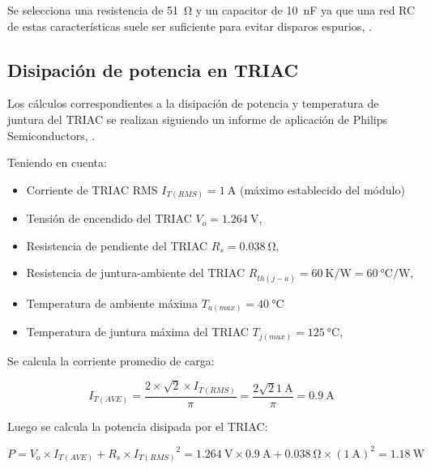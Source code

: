 Se selecciona una resistencia de \SI{51}{\ohm} y un capacitor de \SI{10}{\nano\farad} ya que una red RC de estas características suele ser suficiente para evitar disparos espurios, \parencite{ST-AN437}.

\subsection{Disipación de potencia en TRIAC}

Los cálculos correspondientes a la disipación de potencia y temperatura de juntura del TRIAC se realizan siguiendo un informe de aplicación de Philips Semiconductors, \parencite{PHILIPS-TRIACs}.

Teniendo en cuenta:
\begin{itemize}
    \item Corriente de TRIAC RMS $I_{T(RMS)} = \SI{1}{\ampere}$ (máximo establecido del módulo)
    \item Tensión de encendido del TRIAC $V_{o} = \SI{1.264}{\volt}$, \parencite{BT137}
    \item Resistencia de pendiente del TRIAC $R_{s} = \SI{0.038}{\ohm}$, \parencite{BT137}
    \item Resistencia de juntura-ambiente del TRIAC $R_{th(j-a)} = \SI[per-mode=symbol]{60}{\kelvin\per\watt} = \SI[per-mode=symbol]{60}{\degreeCelsius\per\watt}$, \parencite{BT137}
    \item Temperatura de ambiente máxima $T_{a(max)} = \SI{40}{\degreeCelsius}$
    \item Temperatura de juntura máxima del TRIAC $T_{j(max)} = \SI{125}{\degreeCelsius}$, \parencite{BT137}
\end{itemize}

Se calcula la corriente promedio de carga:

\begin{equation} \label{eq:dimmer:triac_corriente_promedio}
I_{T(AVE)} = \dfrac{2 \times \sqrt{2} \times I_{T(RMS)}}{\pi} = \dfrac{2 \sqrt{2} \SI{1}{\ampere}}{\pi} = \SI{0.9}{\ampere}
\end{equation}

Luego se calcula la potencia disipada por el TRIAC:

\begin{equation} \label{eq:dimmer:triac_potencia}
P = V_o \times I_{T(AVE)} + R_s \times {I_{T(RMS)}}^2 = \SI{1.264}{\volt} \times \SI{0.9}{\ampere} + \SI{0.038}{\ohm} \times (\SI{1}{\ampere})^2 = \SI{1.18}{\watt}
\end{equation}

